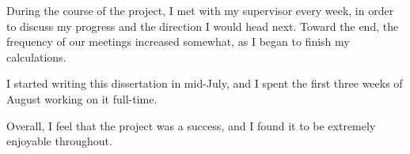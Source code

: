 During the course of the project, I met with my supervisor every week,
in order to discuss my progress and the direction I would head
next. Toward the end, the frequency of our meetings increased
somewhat, as I began to finish my calculations.

I started writing this dissertation in mid-July, and I spent the first
three weeks of August working on it full-time.

Overall, I feel that the project was a success, and I found it to be
extremely enjoyable throughout.


%
%
%
%
%
%
